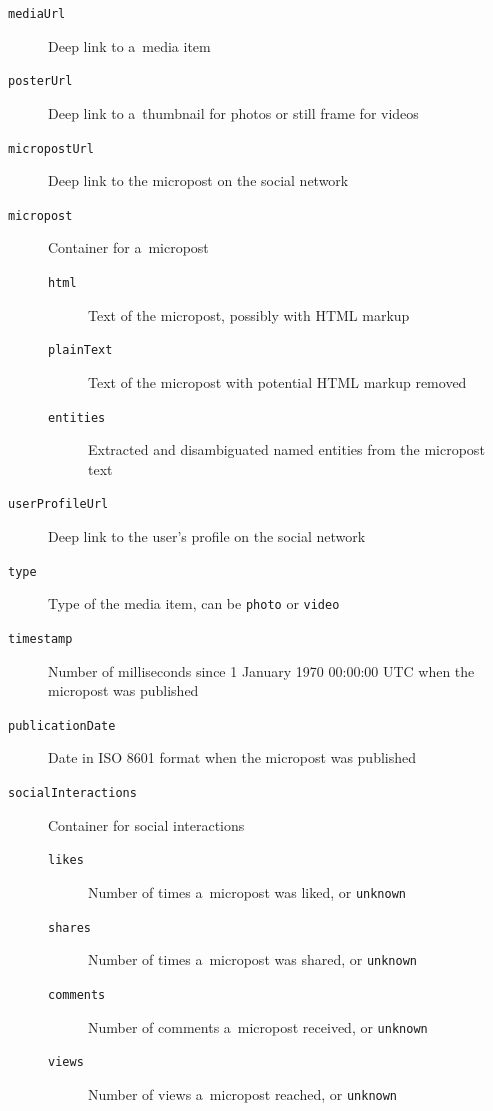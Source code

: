 \begin{description}
  \item[\texttt{mediaUrl}] Deep link to a~media item
  \item[\texttt{posterUrl}] Deep link to a~thumbnail for photos
    or still frame for videos
  \item[\texttt{micropostUrl}] Deep link to the micropost on
    the social network
  \item[\texttt{micropost}] Container for a~micropost
  \begin{description}
    \item[\texttt{html}] Text of the micropost,
      possibly with HTML      markup
    \item[\texttt{plainText}] Text of the micropost with
      potential HTML markup removed
    \item[\texttt{entities}] Extracted and disambiguated
      named entities from the micropost text
  \end{description}      
  \item[\texttt{userProfileUrl}] Deep link to the user's
    profile on the social network
  \item[\texttt{type}] Type of the media item,
    can be \texttt{photo} or \texttt{video}
  \item[\texttt{timestamp}] Number of milliseconds since
    1 January 1970 00:00:00 UTC when the micropost was
    published
  \item[\texttt{publicationDate}] Date in ISO 8601
    format when the micropost was published
  \item[\texttt{socialInteractions}] Container for social
    interactions
  \begin{description}  
  \item[\texttt{likes}] Number of times a~micropost was liked, or
    \texttt{unknown}
  \item[\texttt{shares}] Number of times a~micropost was shared, or
    \texttt{unknown}
  \item[\texttt{comments}] Number of comments a~micropost
    received, or \texttt{unknown}
  \item[\texttt{views}] Number of views a~micropost reached, or
    \texttt{unknown}
  \end{description}    
\end{description}

